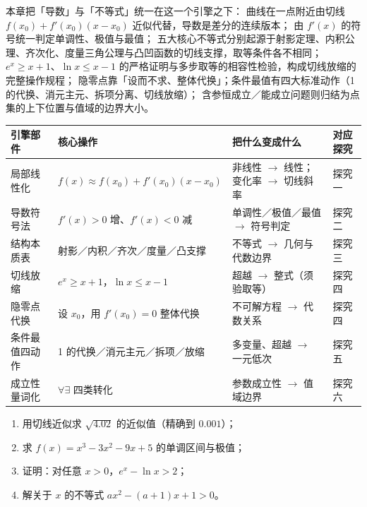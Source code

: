 \begin{explore}
\begin{summary}
本章把「导数」与「不等式」统一在这一个引擎之下：
曲线在一点附近由切线 $f(x_0)+f'(x_0)(x-x_0)$ 近似代替，导数是差分的连续版本；
由 $f'(x)$ 的符号统一判定单调性、极值与最值；
五大核心不等式分别起源于射影定理、内积公理、齐次化、度量三角公理与凸凹函数的切线支撑，取等条件各不相同；
$e^x\ge x+1$、$\ln x\le x-1$ 的严格证明与多步取等的相容性检验，构成切线放缩的完整操作规程；
隐零点靠「设而不求、整体代换」；条件最值有四大标准动作（1 的代换、消元主元、拆项分离、切线放缩）；
含参恒成立／能成立问题则归结为点集的上下位置与值域的边界大小。

\begin{center}
\footnotesize
\setlength{\tabcolsep}{4pt}
\renewcommand{\arraystretch}{1.35}
\begin{tabular}{p{2.3cm}p{4.6cm}p{4.6cm}p{1.9cm}}
\toprule
引擎部件 & 核心操作 & 把什么变成什么 & 对应探究 \\
\midrule
局部线性化 & $f(x)\approx f(x_0)+f'(x_0)(x-x_0)$ & 非线性 $\to$ 线性；变化率 $\to$ 切线斜率 & 探究一 \\
导数符号法 & $f'(x)>0$ 增、$f'(x)<0$ 减 & 单调性／极值／最值 $\to$ 符号判定 & 探究二 \\
结构本质表 & 射影／内积／齐次／度量／凸支撑 & 不等式 $\to$ 几何与代数边界 & 探究三 \\
切线放缩 & $e^x\ge x+1$，$\ln x\le x-1$ & 超越 $\to$ 整式（须验取等） & 探究四 \\
隐零点代换 & 设 $x_0$，用 $f'(x_0)=0$ 整体代换 & 不可解方程 $\to$ 代数关系 & 探究四 \\
条件最值四动作 & 1 的代换／消元主元／拆项／放缩 & 多变量、超越 $\to$ 一元低次 & 探究五 \\
成立性量词化 & $\forall\exists$ 四类转化 & 参数成立性 $\to$ 值域边界 & 探究六 \\
\bottomrule
\end{tabular}
\end{center}

\end{summary}

\end{explore}

\begin{inclasstest}
\begin{enumerate}
  \item 用切线近似求 $\sqrt{4.02}$ 的近似值（精确到 $0.001$）；
  \item 求 $f(x)=x^3-3x^2-9x+5$ 的单调区间与极值；
  \item 证明：对任意 $x>0$，$e^x-\ln x>2$；
  \item 解关于 $x$ 的不等式 $ax^2-(a+1)x+1>0$。
\end{enumerate}
\end{inclasstest}

